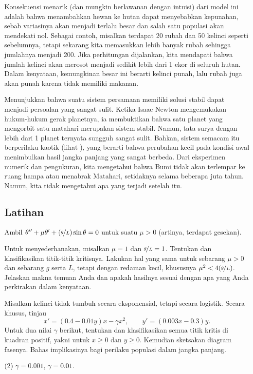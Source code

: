 Konsekuensi menarik (dan mungkin berlawanan dengan intuisi) dari model ini
adalah bahwa menambahkan hewan ke hutan dapat menyebabkan kepunahan, sebab
variasinya akan menjadi terlalu besar dan salah satu populasi akan mendekati
nol. Sebagai contoh, misalkan terdapat 20 rubah dan 50 kelinci seperti
sebelumnya, tetapi sekarang kita memasukkan lebih banyak rubah sehingga
jumlahnya menjadi 200. Jika perhitungan dijalankan, kita mendapati bahwa
jumlah kelinci akan merosot menjadi sedikit lebih dari 1 ekor di seluruh
hutan. Dalam kenyataan, kemungkinan besar ini berarti kelinci punah, lalu
rubah juga akan punah karena tidak memiliki makanan.

Menunjukkan bahwa suatu sistem persamaan memiliki solusi stabil dapat menjadi
persoalan yang sangat sulit. Ketika Isaac Newton mengemukakan hukum-hukum
gerak planetnya, ia membuktikan bahwa satu planet yang mengorbit satu matahari
merupakan sistem stabil. Namun, tata surya dengan lebih dari 1 planet ternyata
sungguh sangat sulit. Bahkan, sistem semacam itu berperilaku kaotik (lihat
), yang berarti bahwa perubahan kecil pada kondisi awal
menimbulkan hasil jangka panjang yang sangat berbeda. Dari eksperimen numerik dan
pengukuran, kita mengetahui bahwa Bumi tidak akan terlempar ke ruang
hampa atau menabrak Matahari, setidaknya selama beberapa juta tahun.
Namun, kita tidak mengetahui apa yang terjadi setelah itu.

\subsection{Latihan}

\begin{exercise}
Ambil \emph{}
$\theta '' + \mu \theta' + (\nicefrac{g}{L})
\sin \theta = 0$ untuk suatu $\mu > 0$ (artinya, terdapat gesekan).
\begin{tasks}
\task
Untuk menyederhanakan, misalkan $\mu = 1$ dan $\nicefrac{g}{L} = 1$.
Tentukan dan klasifikasikan titik-titik kritisnya.
\task
Lakukan hal yang sama untuk sebarang $\mu > 0$ dan sebarang $g$
serta $L$, tetapi dengan redaman kecil, khususnya
$\mu^2 < 4(\nicefrac{g}{L})$.
\task
Jelaskan makna temuan Anda dan apakah hasilnya sesuai dengan apa yang
Anda perkirakan dalam kenyataan.
\end{tasks}
\end{exercise}

\begin{exercise}
Misalkan kelinci tidak tumbuh secara eksponensial, tetapi secara logistik.
Secara khusus, tinjau
\begin{equation*}
x' = (0.4-0.01y)x - \gamma x^2, \qquad y' = (0.003x-0.3)y .
\end{equation*}
Untuk dua nilai $\gamma$ berikut, tentukan dan klasifikasikan semua titik
kritis di kuadran positif, yakni untuk $x \geq 0$ dan $y \geq 0$.
Kemudian sketsakan diagram fasenya. Bahas implikasinya bagi perilaku populasi
dalam jangka panjang.
\begin{tasks}(2)
\task
$\gamma=0.001$, 
\task
$\gamma=0.01$.
\end{tasks}
\end{exercise}

